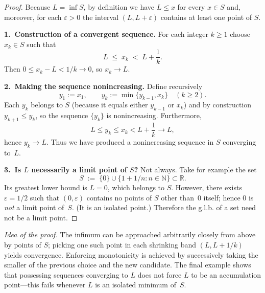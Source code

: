 \documentclass[10pt]{extarticle}
\begin{document}
\begin{proof}
    Because $L=\inf S$, by definition we have $L\le x$ for every $x\in S$ and, moreover, for each $\varepsilon>0$ the interval $(L, L+\varepsilon)$ contains at least one point of $S$.

    \medskip
    \textbf{1.~Construction of a convergent sequence.}  For each integer $k\ge1$ choose $x_{k}\in S$ such that
    \[
        L\;\le\;x_{k}\;<\;L+\frac{1}{k}.
    \]
    Then $0\le x_{k}-L<1/k\to0$, so $x_{k}\to L$.

    \medskip
    \textbf{2.~Making the sequence nonincreasing.}  Define recursively
    \[
        y_{1}:=x_{1},\qquad y_{k}:=\min\{y_{k-1},x_{k}\}\quad(k\ge2).
    \]
    Each $y_{k}$ belongs to $S$ (because it equals either $y_{k-1}$ or $x_{k}$) and by construction $y_{k+1}\le y_{k}$, so the sequence $\{y_{k}\}$ is nonincreasing.  Furthermore,
    \[
        L\le y_{k}\le x_{k}<L+\frac{1}{k}\longrightarrow L,
    \]
    hence $y_{k}\to L$.  Thus we have produced a nonincreasing sequence in $S$ converging to~$L$.

    \medskip
    \textbf{3.~Is $L$ necessarily a limit point of $S$?}  Not always.  Take for example the set
    \[
        S\;:=\;\{0\}\cup\bigl\{1+1/n:n\in\mathbb N\bigr\}\subset\mathbb R.
    \]
    Its greatest lower bound is $L=0$, which belongs to $S$.  However, there exists $\varepsilon=1/2$ such that $(0,\varepsilon)$ contains no points of $S$ other than~$0$ itself; hence $0$ is \emph{not} a limit point of~$S$.  (It is an isolated point.)  Therefore the g.l.b.
    of a set need not be a limit point.
\end{proof}

\begin{remark}
    \emph{Idea of the proof.}  The infimum can be approached arbitrarily closely from above by points of $S$; picking one such point in each shrinking band $(L, L+1/k)$ yields convergence.  Enforcing monotonicity is achieved by successively taking the smaller of the previous choice and the new candidate.  The final example shows that possessing sequences converging to $L$ does not force $L$ to be an accumulation point—this fails whenever $L$ is an isolated minimum of~$S$.
\end{remark}
\end{document}
